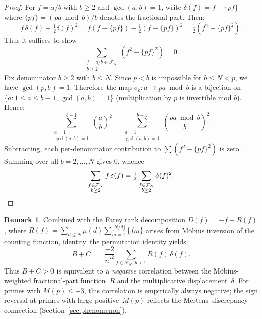 \documentclass[11pt]{article}
\theoremstyle{definition}
\newtheorem{remark}[theorem]{Remark}
\newcommand{\F}{\mathcal{F}}
\begin{document}
\begin{proof}
For $f = a/b$ with $b \ge 2$ and $\gcd(a,b)=1$, write
$\delta(f) = f - \{pf\}$ where $\{pf\} = (pa \bmod b)/b$
denotes the fractional part.  Then:
\begin{equation*}
f\,\delta(f) - \tfrac{1}{2}\delta(f)^2
= f(f - \{pf\}) - \tfrac{1}{2}(f-\{pf\})^2
= \tfrac{1}{2}(f^2 - \{pf\}^2).
\end{equation*}
Thus it suffices to show
\begin{equation*}
\sum_{\substack{f = a/b \in \F_N \\ b \ge 2}} (f^2 - \{pf\}^2) = 0.
\end{equation*}
Fix denominator $b \ge 2$ with $b \le N$.
Since $p < b$ is impossible for $b \le N < p$, we have
$\gcd(p, b) = 1$.  Therefore the map
$\sigma_b : a \mapsto pa \bmod b$
is a bijection on $\{a : 1 \le a \le b-1,\, \gcd(a,b)=1\}$
(multiplication by $p$ is invertible mod $b$).
Hence:
\begin{equation*}
\sum_{\substack{a=1 \\ \gcd(a,b)=1}}^{b-1} \left(\frac{a}{b}\right)^2
= \sum_{\substack{a=1 \\ \gcd(a,b)=1}}^{b-1} \left(\frac{pa \bmod b}{b}\right)^2.
\end{equation*}
Subtracting, each per-denominator contribution to
$\sum (f^2 - \{pf\}^2)$ is zero.  Summing over all
$b = 2, \ldots, N$ gives $0$, whence
\begin{equation*}
\sum_{\substack{f \in \F_N \\ b \ge 2}} f\,\delta(f)
= \tfrac{1}{2}\sum_{\substack{f \in \F_N \\ b \ge 2}} \delta(f)^2. \qedhere
\end{equation*}
\end{proof}

\begin{remark}
Combined with the Farey rank decomposition
$D(f) = -f - R(f)$, where $R(f) = \sum_{d \le N} \mu(d)\sum_{m=1}^{\lfloor N/d\rfloor} \{fm\}$
arises from M\"obius inversion of the counting function,
identity~the permutation identity yields
\[
  B + C \;=\; \frac{-2}{{n'}^2}\sum_{f \in \F_N,\, b > 1} R(f)\,\delta(f).
\]
Thus $B + C > 0$ is equivalent to a \emph{negative} correlation
between the M\"obius-weighted fractional-part function~$R$
and the multiplicative displacement~$\delta$.
For primes with $M(p) \le -3$, this correlation is
empirically always negative; the sign reversal at primes
with large positive~$M(p)$ reflects the Mertens--discrepancy
connection (Section~\ref{sec:phenomenon}).
\end{remark}
\end{document}
